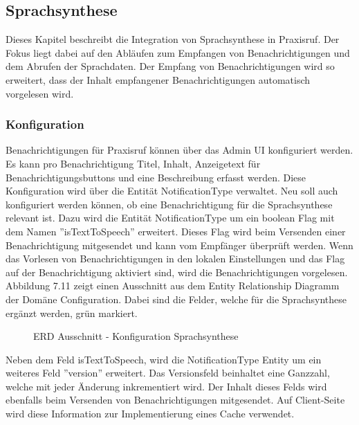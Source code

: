 \subsection{Sprachsynthese}

Dieses Kapitel beschreibt die Integration von Sprachsynthese in Praxisruf.
Der Fokus liegt dabei auf den Abläufen zum Empfangen von Benachrichtigungen und dem Abrufen der Sprachdaten.
Der Empfang von Benachrichtigungen wird so erweitert, dass der Inhalt empfangener Benachrichtigungen automatisch vorgelesen wird.

\subsubsection{Konfiguration}

Benachrichtigungen für Praxisruf können über das Admin UI konfiguriert werden.
Es kann pro Benachrichtigung Titel, Inhalt, Anzeigetext für Benachrichtigungsbuttons und eine Beschreibung erfasst werden.
Diese Konfiguration wird über die Entität NotificationType verwaltet.
Neu soll auch konfiguriert werden können, ob eine Benachrichtigung für die Sprachsynthese relevant ist.
Dazu wird die Entität NotificationType um ein boolean Flag mit dem Namen ''isTextToSpeech'' erweitert.
Dieses Flag wird beim Versenden einer Benachrichtigung mitgesendet und kann vom Empfänger überprüft werden.
Wenn das Vorlesen von Benachrichtigungen in den lokalen Einstellungen und das Flag auf der Benachrichtigung aktiviert sind, wird die Benachrichtigungen vorgelesen.
Abbildung 7.11 zeigt einen Ausschnitt aus dem Entity Relationship Diagramm der Domäne Configuration.
Dabei sind die Felder, welche für die Sprachsynthese ergänzt werden, grün markiert.

\begin{figure}[h]
    \centering
    \begin{minipage}[b]{0.6\textwidth}
        \caption{ERD Ausschnitt - Konfiguration Sprachsynthese}
    \end{minipage}
\end{figure}

Neben dem Feld isTextToSpeech, wird die NotificationType Entity um ein weiteres Feld ''version'' erweitert.
Das Versionsfeld beinhaltet eine Ganzzahl, welche mit jeder Änderung inkrementiert wird.
Der Inhalt dieses Felds wird ebenfalls beim Versenden von Benachrichtigungen mitgesendet.
Auf Client-Seite wird diese Information zur Implementierung eines Cache verwendet.


